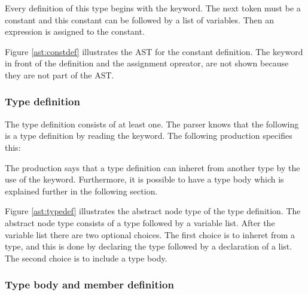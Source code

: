 \begin{ebnf}%
\end{ebnf}%

Every definition of this type begins with the  keyword. The next token must be a constant and this constant can be followed by a list of variables. Then an expression is assigned to the constant.


Figure \ref{ast:constdef} illustrates the AST for the constant definition. The keyword in front of the definition and the assignment opreator, are not shown because they are not part of the AST.

\subsubsection{Type definition}%

The type definition consists of at least one. The parser knows that the following is a type definition by reading the  keyword. The following production specifies this:%

\begin{ebnf}%
\end{ebnf}%

The production says that a type definition can inheret from another type by the use of the  keyword. Furthermore, it is possible to have a type body which is explained further in the following section.


Figure \ref{ast:typedef} illustrates the abstract node type of the type definition. The abstract node type consists of a type followed by a variable list. After the variable list there are two optional choices. The first choice is to inheret from a type, and this is done by declaring the type followed by a declaration of a list. The second choice is to include a type body.

\subsubsection{Type body and member definition}

